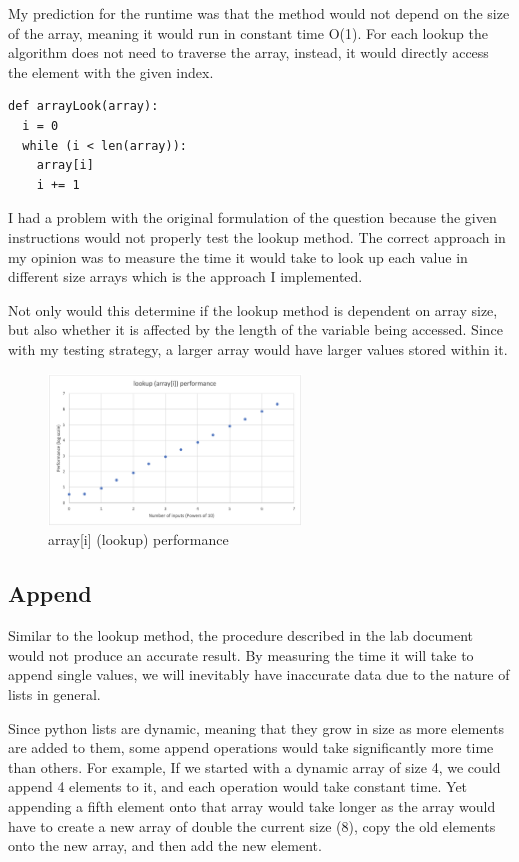\documentclass[12pt]{article}
\begin{document}
My prediction for the runtime was that the method would not depend on the size of the array, meaning it would run in constant time O(1). For each lookup the algorithm does not need to traverse the array, instead, it would directly access the element with the given index.

\footnotesize
\begin{verbatim}
def arrayLook(array):
  i = 0
  while (i < len(array)): 
    array[i]
    i += 1
\end{verbatim}
\normalsize

I had a problem with the original formulation of the question because the given instructions would not properly test the lookup method. The correct approach in my opinion was to measure the time it would take to look up each value in different size arrays which is the approach I implemented. 

Not only would this determine if the lookup method is dependent on array size, but also whether it is affected by the length of the variable being accessed. Since with my testing strategy, a larger array would have larger values stored within it.

\begin{figure}[H]
\centering
\includegraphics[width=0.6\textwidth,height=\textheight,keepaspectratio]{lookupgraph.png}
\caption{array[i] (lookup) performance}
\label{Figure: lookupgraph}
\end{figure}

\subsection{Append}

Similar to the lookup method, the procedure described in the lab document would not produce an accurate result. By measuring the time it will take to append single values, we will inevitably have inaccurate data due to the nature of lists in general. 

Since python lists are dynamic, meaning that they grow in size as more elements are added to them, some append operations would take significantly more time than others. For example, If we started with a dynamic array of size 4, we could append 4 elements to it, and each operation would take constant time. Yet appending a fifth element onto that array would take longer as the array would have to create a new array of double the current size (8), copy the old elements onto the new array, and then add the new element. 
\end{document}
